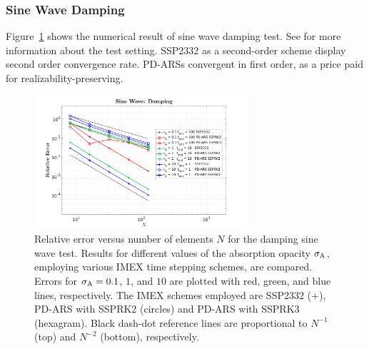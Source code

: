 \subsubsection{Sine Wave Damping}
Figure~\ref{fig:SineWaveDamping} shows the numerical result of sine wave damping test.
See \cite{chu_2018} for more information about the test setting.
SSP2332 as a second-order scheme display second order convergence rate.
PD-ARSs convergent in first order, as a price paid for realizability-preserving.
\begin{figure}[h]
  \centering
    \includegraphics[width=0.7\textwidth]{figures/SineWaveDamping}
   \caption{Relative error versus number of elements $N$ for the damping sine wave test. Results for different values of the absorption opacity $\sigma_{{\rm A}}$, employing various IMEX time stepping schemes, are compared.  Errors for $\sigma_{{\rm A}}=0.1$, $1$, and $10$ are plotted with red, green, and blue lines, respectively.  The IMEX schemes employed are SSP2332 ($+$), PD-ARS with SSPRK2 (circles) and PD-ARS with SSPRK3 (hexagram).  Black dash-dot reference lines are proportional to $N^{-1}$ (top) and $N^{-2}$ (bottom), respectively.}
  \label{fig:SineWaveDamping}
\end{figure}

